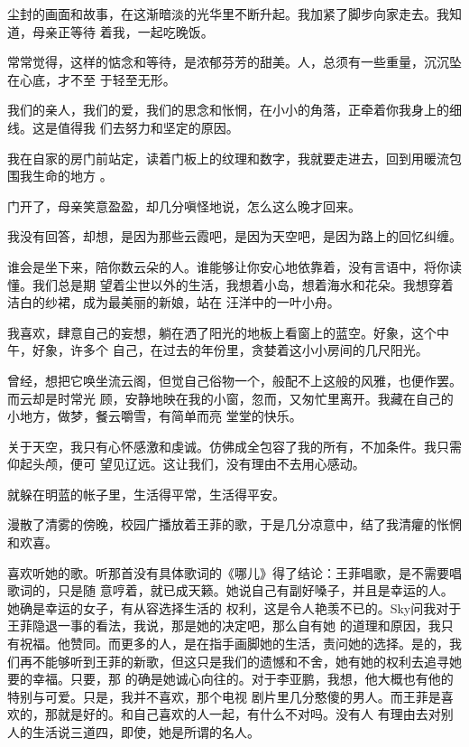 \documentclass[12pt,a4paper]{article}
\begin{document}
		尘封的画面和故事，在这渐暗淡的光华里不断升起。我加紧了脚步向家走去。我知道，母亲正等待
	着我，一起吃晚饭。

		常常觉得，这样的惦念和等待，是浓郁芬芳的甜美。人，总须有一些重量，沉沉坠在心底，才不至
	于轻至无形。

		我们的亲人，我们的爱，我们的思念和怅惘，在小小的角落，正牵着你我身上的细线。这是值得我
	们去努力和坚定的原因。

		我在自家的房门前站定，读着门板上的纹理和数字，我就要走进去，回到用暖流包围我生命的地方
	。

		门开了，母亲笑意盈盈，却几分嗔怪地说，怎么这么晚才回来。

		我没有回答，却想，是因为那些云霞吧，是因为天空吧，是因为路上的回忆纠缠。


		谁会是坐下来，陪你数云朵的人。谁能够让你安心地依靠着，没有言语中，将你读懂。我们总是期
	望着尘世以外的生活，我想着小岛，想着海水和花朵。我想穿着洁白的纱裙，成为最美丽的新娘，站在
	汪洋中的一叶小舟。


		我喜欢，肆意自己的妄想，躺在洒了阳光的地板上看窗上的蓝空。好象，这个中午，好象，许多个
	自己，在过去的年份里，贪婪着这小小房间的几尺阳光。

		曾经，想把它唤坐流云阁，但觉自己俗物一个，般配不上这般的风雅，也便作罢。而云却是时常光
	顾，安静地映在我的小窗，忽而，又匆忙里离开。我藏在自己的小地方，做梦，餐云嚼雪，有简单而亮
	堂堂的快乐。


		关于天空，我只有心怀感激和虔诚。仿佛成全包容了我的所有，不加条件。我只需仰起头颅，便可
	望见辽远。这让我们，没有理由不去用心感动。


		就躲在明蓝的帐子里，生活得平常，生活得平安。

	\endwriting



		漫散了清雾的傍晚，校园广播放着王菲的歌，于是几分凉意中，结了我清癯的怅惘和欢喜。

		喜欢听她的歌。听那首没有具体歌词的《哪儿》得了结论：王菲唱歌，是不需要唱歌词的，只是随
	意哼着，就已成天籁。她说自己有副好嗓子，并且是幸运的人。她确是幸运的女子，有从容选择生活的
	权利，这是令人艳羡不已的。Sky问我对于王菲隐退一事的看法，我说，那是她的决定吧，那么自有她
	的道理和原因，我只有祝福。他赞同。而更多的人，是在指手画脚她的生活，责问她的选择。是的，我
	们再不能够听到王菲的新歌，但这只是我们的遗憾和不舍，她有她的权利去追寻她要的幸福。只要，那
	的确是她诚心向往的。对于李亚鹏，我想，他大概也有他的特别与可爱。只是，我并不喜欢，那个电视
	剧片里几分憨傻的男人。而王菲是喜欢的，那就是好的。和自己喜欢的人一起，有什么不对吗。没有人
	有理由去对别人的生活说三道四，即使，她是所谓的名人。
\end{document}
